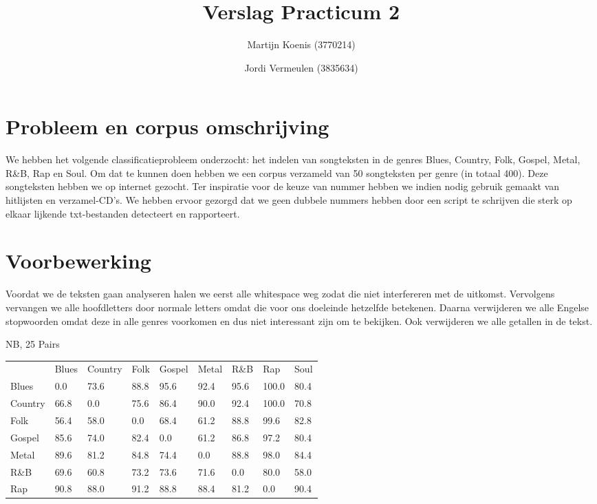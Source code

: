 \documentclass[a4paper,oneside]{article}
\begin{document}
\title{Verslag Practicum 2}
\author{Martijn Koenis (3770214) \and Jordi Vermeulen (3835634)}
\date{}
\maketitle

\begin{abstract}
\end{abstract}

\section{Probleem en corpus omschrijving}
We hebben het volgende classificatieprobleem onderzocht: het indelen van songteksten in de genres Blues, Country, Folk, Gospel, Metal, R\&B, Rap en Soul.  Om dat te kunnen doen hebben we een corpus verzameld van 50 songteksten per genre (in totaal 400). Deze songteksten hebben we op internet gezocht. Ter inspiratie voor de keuze van nummer hebben we indien nodig gebruik gemaakt van hitlijsten en verzamel-CD's. We hebben ervoor gezorgd dat we geen dubbele nummers hebben door een script te schrijven die sterk op elkaar lijkende txt-bestanden detecteert en rapporteert.

\section{Voorbewerking}
Voordat we de teksten gaan analyseren halen we eerst alle whitespace weg zodat die niet interfereren met de uitkomst. Vervolgens vervangen we alle hoofdletters door normale letters omdat die voor ons doeleinde hetzelfde betekenen. Daarna verwijderen we alle Engelse stopwoorden omdat deze in alle genres voorkomen en dus niet interessant zijn om te bekijken. Ook verwijderen we alle getallen in de tekst.

NB, 25
Pairs
\begin{table}
\begin{tabular}{|l||*{8}{l|}} \hline
 & Blues & Country & Folk & Gospel & Metal & R\&B & Rap & Soul \\ \hhline{|=||*{8}{=|}}
Blues & 0.0 & 73.6 & 88.8 & 95.6 & 92.4 & 95.6 & 100.0 & 80.4 \\ \hline
Country & 66.8 & 0.0 & 75.6 & 86.4 & 90.0 & 92.4 & 100.0 & 70.8 \\ \hline
Folk & 56.4 & 58.0 & 0.0 & 68.4 & 61.2 & 88.8 & 99.6 & 82.8 \\ \hline
Gospel & 85.6 & 74.0 & 82.4 & 0.0 & 61.2 & 86.8 & 97.2 & 80.4 \\ \hline
Metal & 89.6 & 81.2 & 84.8 & 74.4 & 0.0 & 88.8 & 98.0 & 84.4 \\ \hline
R\&B & 69.6 & 60.8 & 73.2 & 73.6 & 71.6 & 0.0 & 80.0 & 58.0 \\ \hline
Rap & 90.8 & 88.0 & 91.2 & 88.8 & 88.4 & 81.2 & 0.0 & 90.4 \\ \hline
\end{tabular}
\end{table}
\end{document}
